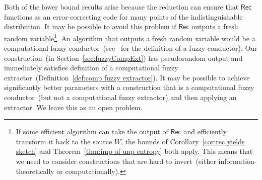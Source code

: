 \documentclass[11pt]{article}
\newcommand{\secref}[1]{\mbox{Section~\ref{#1}}}
\newcommand{\thref}[1]{\mbox{Theorem~\ref{#1}}}
\newcommand{\defref}[1]{\mbox{Definition~\ref{#1}}}
\newcommand{\corref}[1]{\mbox{Corollary~\ref{#1}}}
\newcommand{\class}[1]{{\ensuremath{\mathsf{#1}}}}
\newcommand{\rec}{\ensuremath{\class{Rec}}\xspace}
\begin{document}
Both of the lower bound results arise because the reduction can ensure that \rec functions as an error-correcting code for many points of the indistinguishable distribution.  It may be possible to avoid this problem if \rec outputs a fresh random variable\footnote{If some efficient algorithm can take the output of $\rec$ and efficiently transform it back to the source $W$, the bounds of \corref{cor:rec yields sketch} and \thref{thm:imp of unp entropy} both apply.  This means that we need to consider constructions that are hard to invert~(either information-theoretically or computationally).}.  An algorithm that outputs a fresh random variable would be a computational fuzzy conductor~(see~\cite{KanukurthiR09} for the definition of a fuzzy conductor).  Our construction~(in \secref{sec:fuzzyCompExt}) has pseudorandom output and immediately satisfies definition of a computational fuzzy extractor~(\defref{def:comp fuzzy extractor}).  It may be possible to achieve significantly better parameters with a construction that is a computational fuzzy conductor~(but not a computational fuzzy extractor) and then applying an extractor.  We leave this as an open problem.
\end{document}
